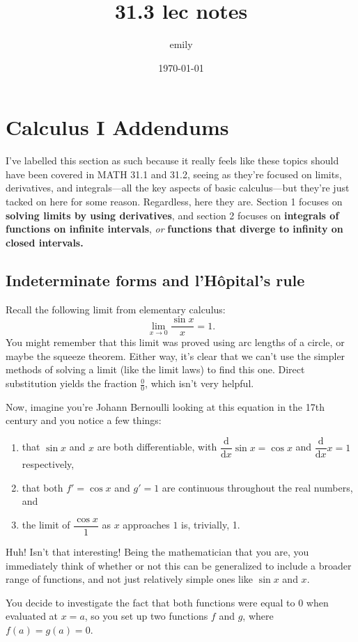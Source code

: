 \documentclass{book}
\title{31.3 lec notes}
\author{emily}
\date{\today}
\newcounter{theo}[section] %
\newcommand{\lh}{l'H\^{o}pital}
\newcommand{\der}{\mathrm{d}}
\begin{document}
\chapter{Calculus I Addendums}
I've labelled this section as such because it really feels like these topics should have been covered in MATH 31.1 and 31.2, seeing as they're focused on
limits, derivatives, and integrals---all the key aspects of basic calculus---but they're just tacked on here for some reason. Regardless, here they are.
Section 1 focuses on \textbf{solving limits by using derivatives}, and section 2 focuses on \textbf{integrals of functions on infinite intervals}, \textit{or}
\textbf{functions that diverge to infinity on closed intervals.}  

\section{Indeterminate forms and \lh's rule} 
Recall the following limit from elementary calculus:\[
    \lim_{x\to 0 } \frac{\sin x}{x} = 1. 
\] You might remember that this limit was proved using arc lengths of a circle, or maybe the squeeze theorem. Either way, it's clear that we can't use
the simpler methods of solving a limit (like the limit laws) to find this one. Direct substitution yields the fraction \(\frac{0}{0}\), which isn't very helpful.\par 
Now, imagine you're Johann Bernoulli looking at this equation in the 17th century and you notice a few things:\begin{enumerate}
    \item that \(\sin x\) and \(x\) are both differentiable, with \(
        \dfrac{\der }{\der x} \sin x = \cos x \) and \( \dfrac{\der }{\der x} x = 1 
    \) respectively,
    \item that both \(f' = \cos x\) and \(g' = 1\) are continuous throughout the real numbers, and 
    \item the limit of \(\dfrac{\cos x}{1}\) as \(x\) approaches \(1\) is, trivially, 1. 
\end{enumerate} 
Huh! Isn't that interesting! Being the mathematician that you are, you immediately think of whether or not this can be generalized to include a broader range 
of functions, and not just relatively simple ones like \(\sin x\) and \(x\).\par 
You decide to investigate the fact that both functions were equal to 0 when evaluated at \(x = a\), so you set up two functions \(f\) and \(g\), where \(f(a) = g(a) = 0\). 
\end{document}
